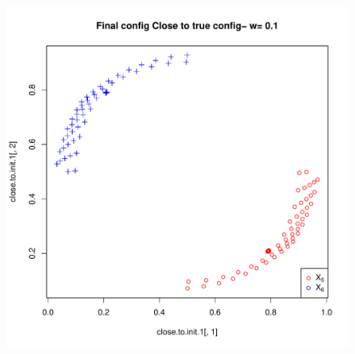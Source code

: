 \documentclass[12pt,oneside,final]{thesis}\usepackage[]{graphicx}\usepackage[]{color}
\makeatletter
\newenvironment{kframe}{%
 \def\at@end@of@kframe{}%
 \ifinner\ifhmode%
  \def\at@end@of@kframe{\end{minipage}}%
  \begin{minipage}{\columnwidth}%
 \fi\fi%
 \def\FrameCommand##1{\hskip\@totalleftmargin \hskip-\fboxsep
 \colorbox{shadecolor}{##1}\hskip-\fboxsep
     \hskip-\linewidth \hskip-\@totalleftmargin \hskip\columnwidth}%
 \MakeFramed {\advance\hsize-\width
   \@totalleftmargin\z@ \linewidth\hsize
   \@setminipage}}%
 {\par\unskip\endMakeFramed%
 \at@end@of@kframe}
\newenvironment{knitrout}{}{} %
\makeatother
\begin{document}
\begin{knitrout}
\color{fgcolor}\begin{kframe}


{\ttfamily\noindent\bfseries{}}\end{kframe}
\end{knitrout}









\begin{figure}
\begin{minipage}[b]{0.5\linewidth}
\centering
\includegraphics[scale=0.45]{true-min-w-0_1.pdf}


\end{minipage}
\end{figure}
\end{document}
